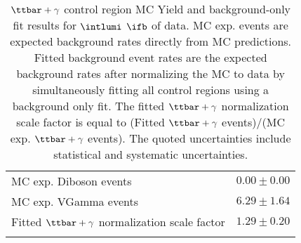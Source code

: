 \begin{table}
\begin{center}
{\begin{tabular*}{\textwidth}{@{\extracolsep{\fill}}lr}
        MC exp. Diboson events         & $0.00 \pm 0.00$              \\
        MC exp. VGamma events         & $6.29 \pm 1.64$              \\
\noalign{\smallskip}\hline\noalign{\smallskip}
Fitted $\ttbar+\gamma$ normalization scale factor & $1.29 \pm 0.20$ \\
\noalign{\smallskip}\hline\noalign{\smallskip}
\end{tabular*}
}
\end{center}
\caption[$\ttbar+\gamma$ control region MC Yield and background-only fit results for $\intlumi$ $\ifb$ of data]{$\ttbar+\gamma$ control region MC Yield and background-only fit results for $\intlumi$ $\ifb$ of data. MC exp. events are expected background rates directly from MC predictions.  Fitted background event rates are the expected background rates after normalizing the MC to data by simultaneously fitting all control regions using a background only fit.  The fitted $\ttbar+\gamma$ normalization scale factor is equal to (Fitted $\ttbar+\gamma$ events)/(MC exp. $\ttbar+\gamma$ events). The quoted uncertainties include statistical and systematic uncertainties. }
\label{table.bkgonly.CRTTgamma}
\end{table}
%
